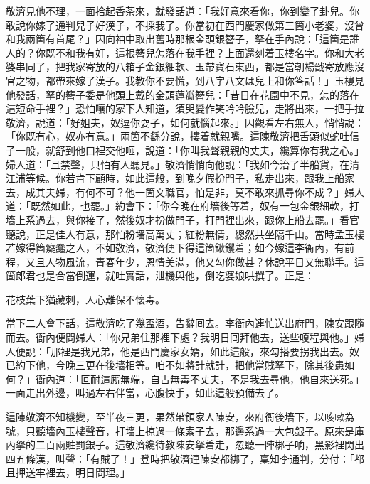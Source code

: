 敬濟見他不理，一面拾起香茶來，就發話道：「我好意來看你，你到變了卦兒。你敢說你嫁了通判兒子好漢子，不採我了。你當初在西門慶家做第三箇小老婆，沒曾和我兩箇有首尾？」因向袖中取出舊時那根金頭銀簪子，拏在手內說：「這箇是誰人的？你既不和我有奸，這根簪兒怎落在我手裡？上面還刻着玉樓名字。你和大老婆串同了，把我家寄放的八箱子金銀細軟、玉帶寶石東西，都是當朝楊戩寄放應沒官之物，都帶來嫁了漢子。我教你不要慌，到八字八文は兒上和你答話！」玉樓見他發話，拏的簪子委是他頭上戴的金頭蓮瓣簪兒：「昔日在花園中不見，怎的落在這短命手裡？」恐怕嚷的家下人知道，須臾變作笑吟吟臉兒，走將出來，一把手拉敬濟，說道：「好姐夫，奴逗你耍子，如何就惱起來。」因觀看左右無人，悄悄說：「你既有心，奴亦有意。」{}兩箇不繇分說，摟着就親嘴。這陳敬濟把舌頭似蛇吐信子一般，就舒到他口裡交他咂，說道：「你叫我聲親親的丈夫，纔算你有我之心。」婦人道：「且禁聲，只怕有人聽見。」敬濟悄悄向他說：「我如今治了半船貨，在清江浦等候。你若肯下顧時，如此這般，到晚夕假扮門子，私走出來，跟我上船家去，成其夫婦，有何不可？他一箇文職官，怕是非，莫不敢來抓尋你不成？」{}婦人道：「既然如此，也罷。」約會下：「你今晚在府墻後等着，奴有一包金銀細軟，打墻上系過去，與你接了，然後奴才扮做門子，打門裡出來，跟你上船去罷。」看官聽說，正是佳人有意，那怕粉墻高萬丈；紅粉無情，總然共坐隔千山。當時孟玉樓若嫁得箇癡蠢之人，不如敬濟，敬濟便下得這箇鍬钁着；如今嫁這李衙內，有前程，又且人物風流，青春年少，恩情美滿，他又勾你做甚？休說平日又無聯手。{}{}這箇郎君也是合當倒運，就吐實話，泄機與他，倒吃婆娘哄撰了。正是：

\begin{myquote}
花枝葉下猶藏刺，人心難保不懷毒。
\end{myquote}

當下二人會下話，這敬濟吃了幾盃酒，告辭囘去。李衙內連忙送出府門，陳安跟隨而去。衙內便問婦人：「你兄弟住那裡下處？我明日囘拜他去，送些嗄程與他。」婦人便說：「那裡是我兄弟，他是西門慶家女婿，如此這般，來勾搭要拐我出去。奴已約下他，今晚三更在後墻相等。咱不如將計就計，把他當賊拏下，除其後患如何？」{}衙內道：「叵耐這厮無端，自古無毒不丈夫，不是我去尋他，他自來送死。」一面走出外邊，叫過左右伴當，心腹快手，如此這般預備去了。

這陳敬濟不知機變，至半夜三更，果然帶領家人陳安，來府衙後墻下，以咳嗽為號，只聽墻內玉樓聲音，打墻上掠過一條索子去，那邊系過一大包銀子。原來是庫內拏的二百兩賍罰銀子。這敬濟纔待教陳安拏着走，忽聽一陣梆子响，黑影裡閃出四五條漢，叫聲：「有賊了！」登時把敬濟連陳安都綁了，稟知李通判，分付：「都且押送牢裡去，明日問理。」

